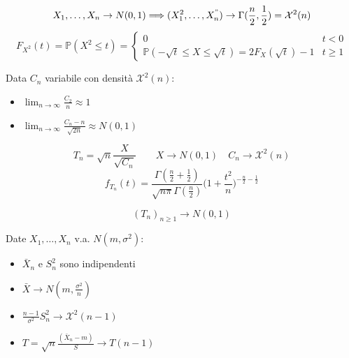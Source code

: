 \begin{definition}
	\begin{equation}
		X_1, \ldots, X_n \to N(0,1) \Longrightarrow (X_1^2, \ldots, X_n^") \to \Gamma(\frac{n}{2}, \frac{1}{2}) = \mathcal{X}^2(n)
	\end{equation}
	\begin{equation}
		F_{X^2}(t) = \mathbb{P}(X^2 \leq t) = \begin{cases}
			0 & t<0 \\
			\mathbb{P}(-\sqrt{t} \leq X \leq \sqrt{t}) = 2F_X(\sqrt{t})-1 & t \geq 1
		\end{cases}
	\end{equation}
\end{definition}

\begin{proposition}
	Data $C_n$ variabile con densità $\mathcal{X}^2(n)$:
	\begin{itemize}
		\item  $\lim_{n \to \infty} \frac{C_2}{n} \approx 1$
		\item $\lim_{n \to \infty} \frac{C_n -n}{\sqrt{2n}} \approx N(0,1)$
	\end{itemize}
\end{proposition}

\begin{definition}
	\begin{equation}
		T_n = \sqrt{n} \frac{X}{\sqrt{C_n}} \quad \quad X \to N(0,1) \quad C_n \to \mathcal{X}^2(n)
	\end{equation}
	\begin{equation}
		f_{T_n}(t) = \frac{\Gamma(\frac{n}{2} + \frac{1}{2})}{\sqrt{n\pi} \Gamma(\frac{n}{2})} \bigg(1+\frac{t^2}{n}\bigg)^{-\frac{n}{2}-\frac{1}{2}}
	\end{equation}
\end{definition}
\begin{proposition}
	\begin{equation}
		(T_n)_{n\geq 1} \longrightarrow N(0,1)
	\end{equation}
\end{proposition}
\begin{proposition}
	Date $X_1, \ldots, X_n$ v.a. $N(m, \sigma^2)$:
	\begin{itemize}
		\item $\bar{X}_n$ e $S^2_n$ sono indipendenti
		\item $\bar{X} \to N(m, \frac{\sigma^2}{n})$
		\item $\frac{n-1}{\sigma^2}S_n^2 \to \mathcal{X}^2(n-1)$
		\item $T=\sqrt{n}\frac{(\bar{X}_n - m)}{S} \to T(n-1)$
	\end{itemize}
\end{proposition}

